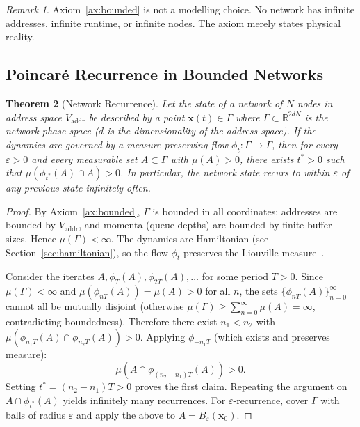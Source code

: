 \documentclass[11pt,twocolumn,a4paper]{article}
\newtheorem{theorem}{Theorem}[section]
\theoremstyle{definition}
\theoremstyle{remark}
\newtheorem{remark}[theorem]{Remark}
\newcommand{\Vaddr}{V_{\mathrm{addr}}}
\begin{document}
\begin{remark}
Axiom~\ref{ax:bounded} is not a modelling choice.  No network has infinite
addresses, infinite runtime, or infinite nodes.  The axiom merely states
physical reality.
\end{remark}

\subsection{Poincar\'e Recurrence in Bounded Networks}\label{sec:poincare}

\begin{theorem}[Network Recurrence]\label{thm:recurrence}
Let the state of a network of $N$ nodes in address space $\Vaddr$ be
described by a point $\bm{x}(t)\in\Gamma$ where
$\Gamma\subset\mathbb{R}^{2dN}$ is the network phase space ($d$ is the
dimensionality of the address space).  If the dynamics are governed by a
measure-preserving flow $\phi_t:\Gamma\to\Gamma$, then for every
$\varepsilon>0$ and every measurable set $A\subset\Gamma$ with
$\mu(A)>0$, there exists $t^{*}>0$ such that
$\mu(\phi_{t^{*}}(A)\cap A)>0$.  In particular, the network state recurs
to within $\varepsilon$ of any previous state infinitely often.
\end{theorem}

\begin{proof}
By Axiom~\ref{ax:bounded}, $\Gamma$ is bounded in all coordinates:
addresses are bounded by $\Vaddr$, and momenta (queue depths) are bounded
by finite buffer sizes.  Hence $\mu(\Gamma)<\infty$.  The dynamics are
Hamiltonian (see Section~\ref{sec:hamiltonian}), so the flow $\phi_t$
preserves the Liouville measure~\cite{Liouville1838,Arnold1989}.

Consider the iterates $A, \phi_T(A), \phi_{2T}(A),\ldots$ for some period
$T>0$.  Since $\mu(\Gamma)<\infty$ and $\mu(\phi_{nT}(A))=\mu(A)>0$ for
all $n$, the sets $\{\phi_{nT}(A)\}_{n=0}^{\infty}$ cannot all be
mutually disjoint (otherwise
$\mu(\Gamma)\geq\sum_{n=0}^{\infty}\mu(A)=\infty$, contradicting
boundedness).  Therefore there exist $n_1<n_2$ with
$\mu(\phi_{n_1 T}(A)\cap\phi_{n_2 T}(A))>0$.  Applying $\phi_{-n_1 T}$
(which exists and preserves measure):
\[
  \mu(A\cap\phi_{(n_2-n_1)T}(A))>0.
\]
Setting $t^{*}=(n_2-n_1)T>0$ proves the first claim.  Repeating the
argument on $A\cap\phi_{t^{*}}(A)$ yields infinitely many recurrences.
For $\varepsilon$-recurrence, cover $\Gamma$ with balls of radius
$\varepsilon$ and apply the above to $A=B_\varepsilon(\bm{x}_0)$.
\end{proof}
\end{document}
